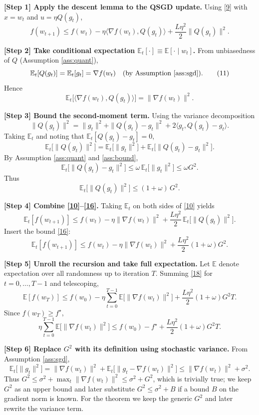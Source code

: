 \documentclass{article}
\begin{document}
\bigskip
\noindent\textbf{[Step 1] Apply the descent lemma to the QSGD update.}  
Using \eqref{9} with $x=w_{t}$ and $u=\eta Q(g_{t})$,
\[
f(w_{t+1})\le f(w_{t})-\eta\langle\nabla f(w_{t}),Q(g_{t})\rangle
+\frac{L\eta^{2}}{2}\|Q(g_{t})\|^{2}.
\tag{10}
\]

\noindent\textbf{[Step 2] Take conditional expectation $\mathbb{E}_{t}[\cdot]\equiv\mathbb{E}[\cdot\mid w_{t}]$.}  
From unbiasedness of $Q$ (Assumption \ref{ass:quant}),
\[
\mathbb{E}_{t}[Q(g_{t})]=\mathbb{E}_{t}[g_{t}]=\nabla f(w_{t}) 
\quad\text{(by Assumption \ref{ass:sgd})}.
\tag{11}
\]
Hence
\[
\mathbb{E}_{t}\big[\langle\nabla f(w_{t}),Q(g_{t})\rangle\big]
= \|\nabla f(w_{t})\|^{2}.
\tag{12}
\]

\noindent\textbf{[Step 3] Bound the second‑moment term.}  
Using the variance decomposition
\[
\|Q(g_{t})\|^{2}
 =\|g_{t}\|^{2}+ \|Q(g_{t})-g_{t}\|^{2}
    +2\langle g_{t},Q(g_{t})-g_{t}\rangle .
\tag{13}
\]
Taking $\mathbb{E}_{t}$ and noting that $\mathbb{E}_{t}[Q(g_{t})-g_{t}]=0$,
\[
\mathbb{E}_{t}\big[\|Q(g_{t})\|^{2}\big]
 =\mathbb{E}_{t}\big[\|g_{t}\|^{2}\big]
   +\mathbb{E}_{t}\big[\|Q(g_{t})-g_{t}\|^{2}\big].
\tag{14}
\]
By Assumption \ref{ass:quant} and \ref{ass:bound},
\[
\mathbb{E}_{t}\big[\|Q(g_{t})-g_{t}\|^{2}\big]\le\omega\,\mathbb{E}_{t}\big[\|g_{t}\|^{2}\big]
\le\omega G^{2}.
\tag{15}
\]
Thus
\[
\mathbb{E}_{t}\big[\|Q(g_{t})\|^{2}\big]\le (1+\omega)\,G^{2}.
\tag{16}
\]

\noindent\textbf{[Step 4] Combine \eqref{10}–\eqref{16}.}  
Taking $\mathbb{E}_{t}$ on both sides of \eqref{10} yields
\[
\mathbb{E}_{t}[f(w_{t+1})]\le f(w_{t})
-\eta\|\nabla f(w_{t})\|^{2}
+\frac{L\eta^{2}}{2}\,\mathbb{E}_{t}\big[\|Q(g_{t})\|^{2}\big].
\tag{17}
\]
Insert the bound \eqref{16}:
\[
\mathbb{E}_{t}[f(w_{t+1})]\le f(w_{t})
-\eta\|\nabla f(w_{t})\|^{2}
+\frac{L\eta^{2}}{2}(1+\omega)G^{2}.
\tag{18}
\]

\noindent\textbf{[Step 5] Unroll the recursion and take full expectation.}  
Let $\mathbb{E}$ denote expectation over all randomness up to iteration $T$. Summing \eqref{18} for $t=0,\dots,T-1$ and telescoping,
\[
\mathbb{E}[f(w_{T})]\le f(w_{0})
-\eta\sum_{t=0}^{T-1}\mathbb{E}\big[\|\nabla f(w_{t})\|^{2}\big]
+\frac{L\eta^{2}}{2}(1+\omega)G^{2}T .
\tag{19}
\]
Since $f(w_{T})\ge f^{\star}$,
\[
\eta\sum_{t=0}^{T-1}\mathbb{E}\big[\|\nabla f(w_{t})\|^{2}\big]
\le f(w_{0})-f^{\star}
+\frac{L\eta^{2}}{2}(1+\omega)G^{2}T .
\tag{20}
\]

\noindent\textbf{[Step 6] Replace $G^{2}$ with its definition using stochastic variance.}  
From Assumption \ref{ass:sgd},
\[
\mathbb{E}_{t}\big[\|g_{t}\|^{2}\big]
= \|\nabla f(w_{t})\|^{2}
   +\mathbb{E}_{t}\big[\|g_{t}-\nabla f(w_{t})\|^{2}\big]
\le \|\nabla f(w_{t})\|^{2}+\sigma^{2}.
\tag{21}
\]
Thus $G^{2}\le \sigma^{2}+ \max_{t}\|\nabla f(w_{t})\|^{2}\le\sigma^{2}+G^{2}$, which is trivially true; we keep $G^{2}$ as an upper bound and later substitute $G^{2}\le\sigma^{2}+B$ if a bound $B$ on the gradient norm is known. For the theorem we keep the generic $G^{2}$ and later rewrite the variance term.
\end{document}
